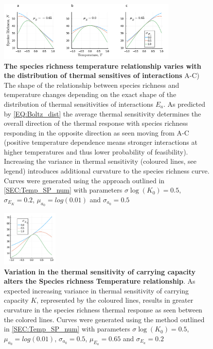 \documentclass{article}
\begin{document}
\begin{figure}
    \centering
    \includegraphics[width=0.8\textwidth]{docs/Figures/Fig_Nsp_Temp_a.pdf}
    \caption{\textbf{The species richness temperature relationship varies with the distribution of thermal sensitives of interactions} A-C) The shape of the relationship between species richness and temperature changes depending on the exact shape of the distribution of thermal sensitivities of interactions $E_a$. As predicted by \cref{EQ:Boltz_dist} the average thermal sensitivity determines the overall direction of the thermal response with species richness responding in the opposite direction as seen moving from A-C (positive temperature dependence means stronger interactions at higher temperatures and thus lower probability of feasibility). Increasing the variance in thermal sensitivity (coloured lines, see legend) introduces additional curvature to the species richness curve. Curves were generated using the approach outlined in \cref{SEC:Temp_SP_num} with parameters $\sigma{\log(K_0)} = 0.5$, $\sigma_{E_K} = 0.2$, $\mu_{a_0} = log(0.01)$ and  $\sigma_{a_0} = 0.5$}
    \label{Fig:N_vs_T_a}
\end{figure}

\begin{figure}
    \centering
    \includegraphics[width=0.25\textwidth]{docs/Figures/Fig_Nsp_Temp_K.pdf}
    \caption{\textbf{Variation in the thermal sensitivity of carrying capacity alters the Species richness Temperature relationship}. As expected increasing variance in thermal sensitivity of carrying capacity $K$, represented by the coloured lines, results in greater curvature in the species richness thermal response as seen between the colored lines. Curves were generated using the method outlined in \cref{SEC:Temp_SP_num} with parameters $\sigma{\log(K_0)} = 0.5$, $\mu_{a_0} = log(0.01)$, $\sigma_{a_0} = 0.5$, $\mu_{E_a} = 0.65$ and $\sigma_{E_a} = 0.2$}
    \label{fig:N_vs_T_K}
\end{figure}
\end{document}
